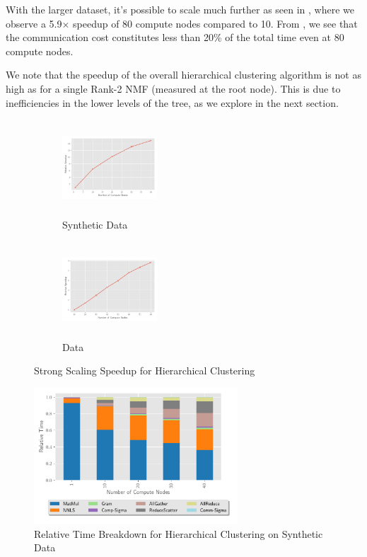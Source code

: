 With the larger \image{} dataset, it's possible to scale much further as seen in , where we observe a 5.9$\times$ speedup of 80 compute nodes compared to 10.
From , we see that the communication cost constitutes less than 20\% of the total time even at 80 compute nodes. 

We note that the speedup of the overall hierarchical clustering algorithm is not as high as for a single Rank-2 NMF (measured at the root node).
This is due to inefficiencies in the lower levels of the tree, as we explore in the next section.


\begin{figure}
\begin{subfigure}{1.5in}
\begin{center}
\includegraphics[height=1.4in, width=1.4in]{plots/synthetic_hierarchical_speedup.pdf}
\caption{Synthetic Data}
\label{fig:synhierspeedup}
\end{center}
\end{subfigure}
\begin{subfigure}{1.5in}
\begin{center}
\includegraphics[height=1.4in, width=1.4in]{plots/realworld_hierarchical_speedup.pdf}
\caption{\image{} Data}
\label{fig:rwhierspeedup}
\end{center}
\end{subfigure}
\caption{Strong Scaling Speedup for Hierarchical Clustering}
\label{fig:rank2speedup}
\end{figure}

\begin{figure}
\begin{center}
\includegraphics[height=2in, width=\columnwidth]{plots/synthetic_hier_strongscaling.pdf}
\caption{Relative Time Breakdown for Hierarchical Clustering on Synthetic Data}
\label{fig:synhierstrongscaling}
\end{center}
\end{figure}

